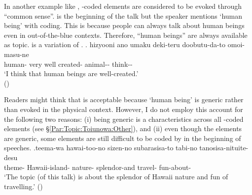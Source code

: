 In another example like \Next,
-coded elements are considered to be evoked through ``common sense''.
\Next is the beginning of the talk
but the speaker mentions  `human being' with  coding.
This is because
people can always talk about human beings even in out-of-the-blue contexts.
Therefore, ``human beings'' are always available as topic.
 is a variation of .
%
\exg.\label{ExNingenToiunowa} hizyooni ano umaku deki-teru doobutu-da-to omoi-masu-ne \\
	human- very  well created- animal-- think-- \\
	`I think that human beings are well-created.' \\
 \hfill{()}
%

Readers might think that \Last is acceptable because `human being' is generic rather than evoked in the physical context.
However, I do not employ this account for the following two reasons:
(i) being generic is a characteristics across all -coded elements (see \S \ref{Par:Topic:Toiunowa:Other}), and
(ii) even though the elements are generic, some elements are still difficult to be coded by  in the beginning of speeches.
%
\exg.\label{Par:Toiunowa:Ex:Hawaii}teema-wa hawai-too-no sizen-no subarasisa-to tabi-no tanosisa-nituite-desu \\
   theme- Hawaii-island- nature- splendor-and travel- fun-about- \\
   `The topic (of this talk) is about the splendor of Hawaii nature and fun of travelling.'
 \hfill{()}

